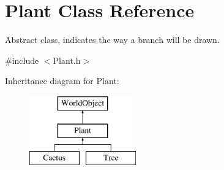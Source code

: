 \hypertarget{class_plant}{\section{Plant Class Reference}
\label{class_plant}
}


Abstract class, indicates the way a branch will be drawn.  




{\ttfamily \#include $<$Plant.\+h$>$}

Inheritance diagram for Plant\+:\begin{figure}[H]
\begin{center}
\leavevmode
\includegraphics[height=3.000000cm]{class_plant}
\end{center}
\end{figure}
